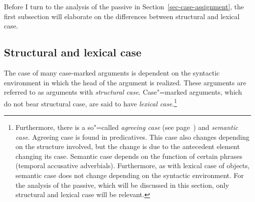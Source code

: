 Before I turn to the analysis of the passive in Section~\ref{sec-case-assignment}, the first subsection will elaborate on the differences
between structural and lexical case.

\subsection{Structural and lexical case}
\label{Abschnitt-struktureller-Kasus}

The case of many case-marked arguments is dependent on the syntactic environment in which the head
of the argument is realized. These arguments are referred to as arguments with \emph{structural case}. Case"=marked arguments, which
do not bear structural case, are said to have \emph{lexical case}.\footnote{%
Furthermore, there is a so"=called \emph{agreeing case} (see page~\pageref{page-Kasuskongruenz}) and \emph{semantic case}. Agreeing case is
found in predicatives. This case also changes depending on the structure involved, but the change is
due to the antecedent element changing its case. Semantic case depends on the function of certain
phrases (\eg temporal accusative adverbials). Furthermore, as with lexical case of objects, semantic case does not change
depending on the syntactic environment. For the analysis of the passive, which will be discussed in this section, only
structural and lexical case will be relevant.}

